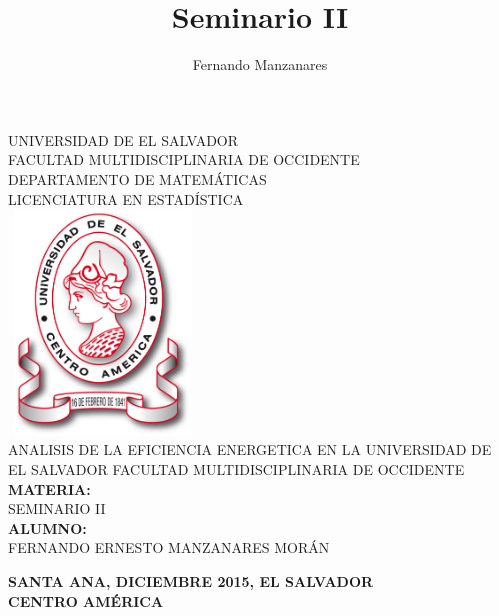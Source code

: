 \documentclass[12pt,letterpaper]{report}
\author{Fernando Manzanares}
\title{Seminario II}
\begin{document}



\thispagestyle{empty}

\begin{center}
UNIVERSIDAD DE EL SALVADOR \\ FACULTAD MULTIDISCIPLINARIA DE OCCIDENTE \\ DEPARTAMENTO DE MATEMÁTICAS \\
LICENCIATURA EN ESTADÍSTICA\\
\bigskip
\includegraphics [width=5cm,height=6cm]{Minerva}
\bigskip
\\ ANALISIS DE LA EFICIENCIA ENERGETICA EN LA UNIVERSIDAD DE EL SALVADOR FACULTAD MULTIDISCIPLINARIA DE OCCIDENTE \\
\bigskip
\textbf{MATERIA:}\\ 
SEMINARIO II\\
\textbf{ALUMNO:}\\ 
FERNANDO ERNESTO MANZANARES MORÁN\\
\bigskip
\bigskip
\bigskip
\bigskip
\bigskip
\bigskip

\textbf{SANTA ANA,    DICIEMBRE 2015,   EL SALVADOR}\\
\textbf{CENTRO AMÉRICA}\\


\end{center}



\tableofcontents 
\thispagestyle{empty}
\end{document}
